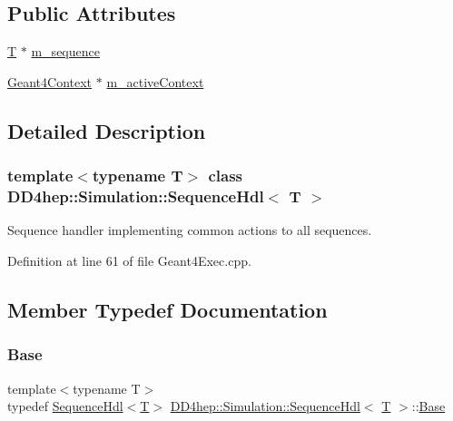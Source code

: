 \subsection*{Public Attributes}
\begin{DoxyCompactItemize}
\item 
\hyperlink{class_t}{T} $\ast$ \hyperlink{class_d_d4hep_1_1_simulation_1_1_sequence_hdl_ae825c3a994baf6bb24fd37e547a67dff}{m\+\_\+sequence}
\item 
\hyperlink{class_d_d4hep_1_1_simulation_1_1_geant4_context}{Geant4\+Context} $\ast$ \hyperlink{class_d_d4hep_1_1_simulation_1_1_sequence_hdl_addf2b3ddaa1263ae4213a5189f7859b5}{m\+\_\+active\+Context}
\end{DoxyCompactItemize}


\subsection{Detailed Description}
\subsubsection*{template$<$typename T$>$\newline
class D\+D4hep\+::\+Simulation\+::\+Sequence\+Hdl$<$ T $>$}

Sequence handler implementing common actions to all sequences. 

Definition at line 61 of file Geant4\+Exec.\+cpp.



\subsection{Member Typedef Documentation}
\hypertarget{class_d_d4hep_1_1_simulation_1_1_sequence_hdl_a447b2bee9267559ffef742eef84fb1cc}{}\label{class_d_d4hep_1_1_simulation_1_1_sequence_hdl_a447b2bee9267559ffef742eef84fb1cc} 
\subsubsection{\texorpdfstring{Base}{Base}}
{\footnotesize\ttfamily template$<$typename T$>$ \\
typedef \hyperlink{class_d_d4hep_1_1_simulation_1_1_sequence_hdl}{Sequence\+Hdl}$<$\hyperlink{class_t}{T}$>$ \hyperlink{class_d_d4hep_1_1_simulation_1_1_sequence_hdl}{D\+D4hep\+::\+Simulation\+::\+Sequence\+Hdl}$<$ \hyperlink{class_t}{T} $>$\+::\hyperlink{class_d_d4hep_1_1_simulation_1_1_sequence_hdl_a447b2bee9267559ffef742eef84fb1cc}{Base}}



